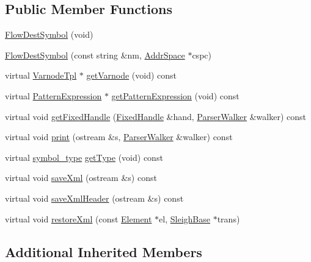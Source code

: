 \subsection*{Public Member Functions}
\begin{DoxyCompactItemize}
\item 
\mbox{\hyperlink{class_flow_dest_symbol_ab3f23c5cbfb5adbf08c75f3db2c096bc}{Flow\+Dest\+Symbol}} (void)
\item 
\mbox{\hyperlink{class_flow_dest_symbol_a95ad20cff6f52ccfbef3b2ff97734e02}{Flow\+Dest\+Symbol}} (const string \&nm, \mbox{\hyperlink{class_addr_space}{Addr\+Space}} $\ast$cspc)
\item 
virtual \mbox{\hyperlink{class_varnode_tpl}{Varnode\+Tpl}} $\ast$ \mbox{\hyperlink{class_flow_dest_symbol_a458927a68a220edf0c8c2acf687ce906}{get\+Varnode}} (void) const
\item 
virtual \mbox{\hyperlink{class_pattern_expression}{Pattern\+Expression}} $\ast$ \mbox{\hyperlink{class_flow_dest_symbol_ad213382efabd756f4246ac8dd15f5a90}{get\+Pattern\+Expression}} (void) const
\item 
virtual void \mbox{\hyperlink{class_flow_dest_symbol_aac3ddb7a9bff23acbd59f3b44f477d10}{get\+Fixed\+Handle}} (\mbox{\hyperlink{struct_fixed_handle}{Fixed\+Handle}} \&hand, \mbox{\hyperlink{class_parser_walker}{Parser\+Walker}} \&walker) const
\item 
virtual void \mbox{\hyperlink{class_flow_dest_symbol_a94cdef08349b4081b2559fc39037fcce}{print}} (ostream \&s, \mbox{\hyperlink{class_parser_walker}{Parser\+Walker}} \&walker) const
\item 
virtual \mbox{\hyperlink{class_sleigh_symbol_aba70f7f332fd63488c5ec4bd7807db41}{symbol\+\_\+type}} \mbox{\hyperlink{class_flow_dest_symbol_aea696fbb6a4d8a5cca775917c85d9dfb}{get\+Type}} (void) const
\item 
virtual void \mbox{\hyperlink{class_flow_dest_symbol_a2323c675f5969475af4030a87ae45319}{save\+Xml}} (ostream \&s) const
\item 
virtual void \mbox{\hyperlink{class_flow_dest_symbol_a5e0a88af96879af7f778fdbc0bfa0a27}{save\+Xml\+Header}} (ostream \&s) const
\item 
virtual void \mbox{\hyperlink{class_flow_dest_symbol_a1ba9aafc51b34b72972f50748de739cc}{restore\+Xml}} (const \mbox{\hyperlink{class_element}{Element}} $\ast$el, \mbox{\hyperlink{class_sleigh_base}{Sleigh\+Base}} $\ast$trans)
\end{DoxyCompactItemize}
\subsection*{Additional Inherited Members}


